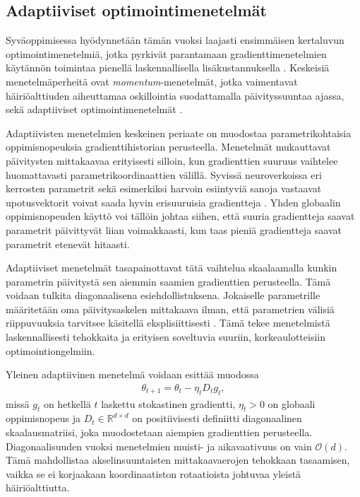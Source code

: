 \subsection{Adaptiiviset optimointimenetelmät}

Syväoppimisessa hyödynnetään tämän vuoksi laajasti ensimmäisen kertaluvun
optimointimenetelmiä, jotka pyrkivät parantamaan gradienttimenetelmien
käytännön toimintaa pienellä laskennallisella lisäkustannuksella \cite{goodfellow2016deep}.
Keskeisiä menetelmäperheitä ovat \emph{momentum}-menetelmät, jotka
vaimentavat häiriöalttiuden aiheuttamaa oskillointia suodattamalla
päivityssuuntaa ajassa, sekä adaptiiviset optimointimenetelmät \cite{kingma2015adam}.

Adaptiivisten menetelmien keskeinen periaate on muodostaa
parametrikohtaisia oppimisnopeuksia gradienttihistorian perusteella.
Menetelmät mukauttavat päivitysten mittakaavaa erityisesti silloin, kun
gradienttien suuruus vaihtelee huomattavasti parametrikoordinaattien
välillä. Syvissä neuroverkoissa eri kerrosten parametrit sekä esimerkiksi
harvoin esiintyviä sanoja vastaavat upotusvektorit voivat saada
hyvin erisuuruisia gradientteja \cite{duchi2011adaptive}. Yhden globaalin oppimisnopeuden käyttö
voi tällöin johtaa siihen, että suuria gradientteja saavat parametrit
päivittyvät liian voimakkaasti, kun taas pieniä gradientteja saavat
parametrit etenevät hitaasti.

Adaptiiviset menetelmät tasapainottavat tätä vaihtelua skaalaamalla kunkin
parametrin päivitystä sen aiemmin saamien gradienttien perusteella.
Tämä voidaan tulkita diagonaalisena esiehdollistuksena.
Jokaiselle parametrille määritetään oma päivitysaskelen mittakaava ilman,
että parametrien välisiä riippuvuuksia tarvitsee käsitellä eksplisiittisesti \cite{bottou2018optimization,duchi2011adaptive}.
Tämä tekee menetelmistä laskennallisesti tehokkaita ja erityisen
soveltuvia suuriin, korkeaulotteisiin optimointiongelmiin.

Yleinen adaptiivinen menetelmä voidaan esittää muodossa
\begin{align*}
  \theta_{t+1}
  =
  \theta_t-\eta_t D_t g_t,
\end{align*}
missä \(g_t\) on hetkellä \(t\) laskettu stokastinen gradientti,
\(\eta_t>0\) on globaali oppimisnopeus ja
\(D_t \in \mathbb{R}^{d\times d}\)
on positiivisesti definiitti diagonaalinen skaalausmatriisi, joka muodostetaan aiempien gradienttien perusteella. Diagonaalisuuden
vuoksi menetelmien muisti- ja aikavaativuus on vain \(\mathcal{O}(d)\).
Tämä mahdollistaa akselinsuuntaisten mittakaavaerojen tehokkaan
tasaamisen, vaikka se ei korjaakaan koordinaatiston rotaatioista johtuvaa
yleistä häiriöalttiutta.

